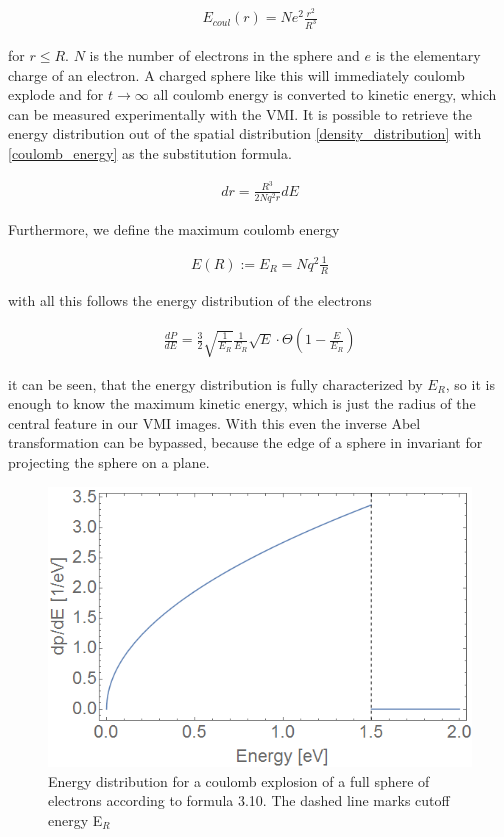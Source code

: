 \begin{align}
E_{coul}(r)=Ne^2 \frac{r^2}{R^3}
\label{coulomb_energy}
\end{align}

for $r\leq R$. $N$ is the number of electrons in the sphere and $e$ is the elementary charge of an electron. A charged sphere like this will immediately coulomb explode and for $t \longrightarrow \infty$ all coulomb energy is converted to kinetic energy, which can be measured experimentally with the VMI. It is possible to retrieve the energy distribution out of the spatial distribution \ref{density_distribution} with \ref{coulomb_energy} as the substitution formula.

\begin{align}
dr=\frac{R^3}{2Nq^2r}dE
\label{substitution}
\end{align}

Furthermore, we define the maximum coulomb energy

\begin{align}
E(R):=E_R=Nq^2 \frac{1}{R}
\label{max_coul_energy}
\end{align}

with all this follows the energy distribution of the electrons

\begin{align}
\frac{dP}{dE}=\frac{3}{2} \sqrt{\frac{1}{E_R}} \frac{1}{E_R}\sqrt{E} \cdot \Theta (1-\frac{E}{E_R})
\end{align}

it can be seen, that the energy distribution is fully characterized by $E_R$, so it is enough to know the maximum kinetic energy, which is just the radius of the central feature in our VMI images. With this even the inverse Abel transformation can be bypassed, because the edge of a sphere in invariant for projecting the sphere on a plane.
\begin{figure}[hbtp]

\centering
\includegraphics[scale=0.4]{../Images/linemodelfit.png}
\caption[Islam Model fit]{Energy distribution for a coulomb explosion of a full sphere of electrons according to formula 3.10. The dashed line marks cutoff energy E$_{R} $}
\end{figure}


